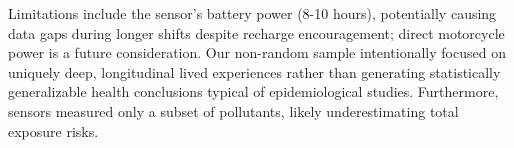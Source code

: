 Limitations include the sensor's battery power (8-10 hours), potentially causing data gaps during longer shifts despite recharge encouragement; direct motorcycle power is a future consideration.
Our non-random sample intentionally focused on uniquely deep, longitudinal lived experiences rather than generating statistically generalizable health conclusions typical of epidemiological studies.
Furthermore, sensors measured only a subset of pollutants, likely underestimating total exposure risks.